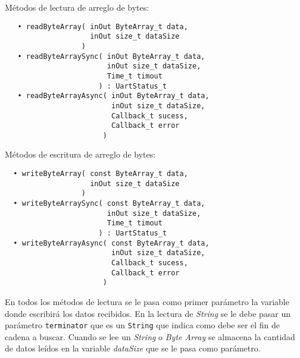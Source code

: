 Métodos de lectura de arreglo de bytes:

\begin{verbatim}
   • readByteArray( inOut ByteArray_t data,
                    inOut size_t dataSize
                  )
   • readByteArraySync( inOut ByteArray_t data,
                        inOut size_t dataSize,
                        Time_t timout
                      ) : UartStatus_t
   • readByteArrayAsync( inOut ByteArray_t data, 
                         inOut size_t dataSize,
                         Callback_t sucess,
                         Callback_t error 
                       )
\end{verbatim}

Métodos de escritura de arreglo de bytes:

\begin{verbatim}
  • writeByteArray( const ByteArray_t data,
                    inOut size_t dataSize
                  )
  • writeByteArraySync( const ByteArray_t data,
                        inOut size_t dataSize,
                        Time_t timout
                      ) : UartStatus_t
  • writeByteArrayAsync( const ByteArray_t data, 
                         inOut size_t dataSize,
                         Callback_t sucess,
                         Callback_t error
                       )
\end{verbatim}

En todos los métodos de lectura se le pasa como primer parámetro la variable donde escribirá los datos recibidos. En la lectura de \emph{String} se le debe pasar un parámetro \texttt{terminator} que es un \texttt{String} que indica como debe ser el fin de cadena a buscar. Cuando se lee un \emph{String} o \emph{Byte Array} se almacena la cantidad de datos leídos en la variable \emph{dataSize} que se le pasa como parámetro.
